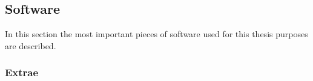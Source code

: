 \subsection{Software}

In this section the most important pieces of software used for this thesis
purposes are described. 

\subsubsection{Extrae}

